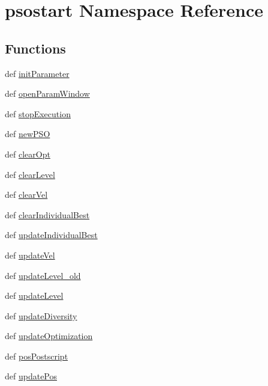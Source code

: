 \hypertarget{namespacepsostart}{
\section{psostart Namespace Reference}
\label{namespacepsostart}
}


\subsection*{Functions}
\begin{CompactItemize}
\item 
def \hyperlink{namespacepsostart_46de2e454e8f5515ab708b73b048290c}{initParameter}
\item 
def \hyperlink{namespacepsostart_535536df8dda7d5b4bdcb24c0cc4ef1c}{openParamWindow}
\item 
def \hyperlink{namespacepsostart_373a16f17d46de694c2e909df34a6959}{stopExecution}
\item 
def \hyperlink{namespacepsostart_54da7e101aee6e4874e0e8f725267920}{newPSO}
\item 
def \hyperlink{namespacepsostart_b16f0613573a26782623601f5311b1cd}{clearOpt}
\item 
def \hyperlink{namespacepsostart_3c2fc695e3997b0bff7cddfb8c832834}{clearLevel}
\item 
def \hyperlink{namespacepsostart_50d9c4abda05d089b5a7ae925c7a2ba3}{clearVel}
\item 
def \hyperlink{namespacepsostart_da7f48a1a5af9be960f84bcf824048e7}{clearIndividualBest}
\item 
def \hyperlink{namespacepsostart_30b25a03549a24379c2bc24719b2f9e3}{updateIndividualBest}
\item 
def \hyperlink{namespacepsostart_c11d727534d1250233b64a93f3f3cb7a}{updateVel}
\item 
def \hyperlink{namespacepsostart_d1847be4b615bd0ff48b394c0a87c06b}{updateLevel\_\-old}
\item 
def \hyperlink{namespacepsostart_51a068be9b5acbd1b3efe519bb9a8889}{updateLevel}
\item 
def \hyperlink{namespacepsostart_6198f0bf7f2b5cb4e8ef30f833cd330d}{updateDiversity}
\item 
def \hyperlink{namespacepsostart_41a266932f22b150471c377521350b49}{updateOptimization}
\item 
def \hyperlink{namespacepsostart_3b593b84164761e4d5faa573593f2eea}{posPostscript}
\item 
def \hyperlink{namespacepsostart_426451722c8ab591f51f6bf2f8b574a0}{updatePos}

\end{CompactItemize}
